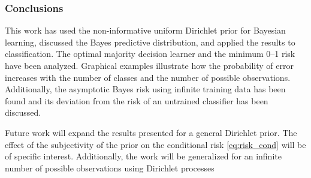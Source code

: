 \documentclass{beamer}
\begin{document}
\begin{frame}
\frametitle{Conclusions}

This work has used the non-informative uniform Dirichlet prior for Bayesian learning, discussed the Bayes predictive distribution, and applied the results to classification. The optimal majority decision learner and the minimum 0--1 risk have been analyzed. Graphical examples illustrate how the probability of error increases with the number of classes and the number of possible observations. Additionally, the asymptotic Bayes risk using infinite training data has been found and its deviation from the risk of an untrained classifier has been discussed. 

Future work will expand the results presented for a general Dirichlet prior. The effect of the subjectivity of the prior on the conditional risk \eqref{eq:risk_cond} will be of specific interest. Additionally, the work will be generalized for an infinite number of possible observations using Dirichlet processes

\end{frame}
\end{document}
